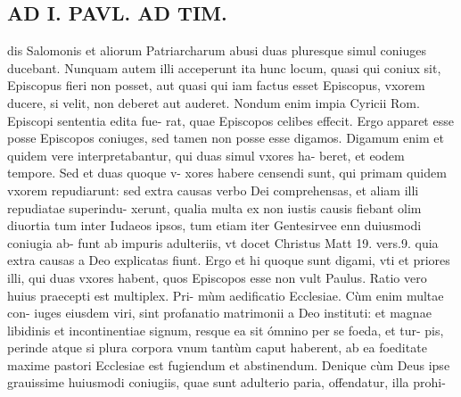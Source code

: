 \documentclass{article}
\begin{document}
\begin{pages}
\section*{AD I. PAVL. AD TIM. }
\marginpar{[ p.106 ]}\pstart dis Salomonis et aliorum Patriarcharum abusi duas pluresque simul coniuges ducebant. Nunquam autem illi acceperunt ita hunc locum, quasi qui coniux sit, Episcopus fieri non posset, aut quasi qui iam factus esset Episcopus, vxorem ducere, si velit, non deberet aut auderet. Nondum enim impia Cyricii Rom. Episcopi sententia edita fue- rat, quae Episcopos celibes effecit. Ergo apparet esse posse Episcopos coniuges, sed tamen non posse esse digamos. Digamum enim et quidem vere interpretabantur, qui duas simul vxores ha- beret, et eodem tempore. Sed et duas quoque v- xores habere censendi sunt, qui primam quidem vxorem repudiarunt: sed extra causas verbo Dei comprehensas, et aliam illi repudiatae superindu- xerunt, qualia multa ex non iustis causis fiebant olim diuortia tum inter Iudaeos ipsos, tum etiam iter Gentesirvee enn duiusmodi coniugia ab- funt ab impuris adulteriis, vt docet Christus Matt 19. vers.9. quia extra causas a Deo explicatas fiunt. Ergo et hi quoque sunt digami, vti et priores illi, qui duas vxores habent, quos Episcopos esse non vult Paulus.  \pend\pstart Ratio vero huius praecepti est multiplex. Pri- mùm aedificatio Ecclesiae. Cùm enim multae con- iuges eiusdem viri, sint profanatio matrimonii a Deo instituti: et magnae libidinis et incontinentiae signum, resque ea sit ómnino per se foeda, et tur- pis, perinde atque si plura corpora vnum tantùm caput haberent, ab ea foeditate maxime pastori Ecclesiae est fugiendum et abstinendum. Denique  cùm Deus ipse grauissime huiusmodi coniugiis, quae sunt adulterio paria, offendatur, illa prohi-  \pend

\end{pages}
\end{document}
